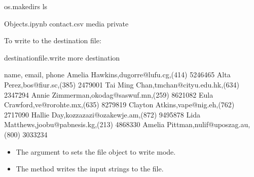 \documentclass[letterpaper,10pt,english]{sphinxmanual}
\begin{document}
\begin{sphinxVerbatim}[commandchars=\\\{\}]
os.makedirs
ls
\end{sphinxVerbatim}

\begin{sphinxVerbatim}[commandchars=\\\{\}]
Objects.ipynb  contact.csv  media  private
\end{sphinxVerbatim}

To write to the destination file:

\begin{sphinxVerbatim}[commandchars=\\\{\}]
   
        
\end{sphinxVerbatim}

\begin{sphinxVerbatim}[commandchars=\\\{\}]
destination\PYGZus{}file.write
more destination
\end{sphinxVerbatim}

\begin{sphinxVerbatim}[commandchars=\\\{\}]
name, email, phone
Amelia Hawkins,dugorre@lufu.cg,(414) 524\PYGZhy{}6465
Alta Perez,bos@fiur.sc,(385) 247\PYGZhy{}9001
Tai Ming Chan,tmchan@cityu.edu.hk,(634) 234\PYGZhy{}7294
Annie Zimmerman,okodag@saswuf.mn,(259) 862\PYGZhy{}1082
Eula Crawford,ve@rorohte.mx,(635) 827\PYGZhy{}9819
Clayton Atkins,vape@nig.eh,(762) 271\PYGZhy{}7090
Hallie Day,kozzazazi@ozakewje.am,(872) 949\PYGZhy{}5878
Lida Matthews,joobu@pabnesis.kg,(213) 486\PYGZhy{}8330
Amelia Pittman,nulif@uposzag.au,(800) 303\PYGZhy{}3234
\end{sphinxVerbatim}
\begin{itemize}
\item {} 
The argument  to  sets the file object to write mode.

\item {} 
The method  writes the input strings to the file.

\end{itemize}
\end{document}
